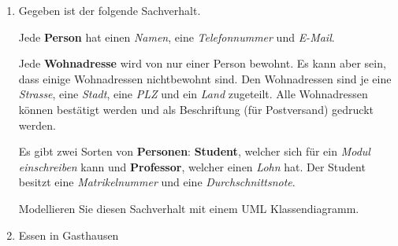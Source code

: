 \documentclass{lehramt-informatik-haupt}
\begin{document}
\begin{enumerate}
\item Gegeben ist der folgende Sachverhalt.
\cite[Seite 4]{net:pdf:uzh-zuerich:uebung-4}

Jede \textbf{Person} hat einen \emph{Namen}, eine \emph{Telefonnummer}
und \emph{E-Mail}.

Jede \textbf{Wohnadresse} wird von nur einer Person bewohnt. Es kann
aber sein, dass einige Wohnadressen nichtbewohnt sind. Den Wohnadressen
sind je eine \emph{Strasse}, eine \emph{Stadt}, eine \emph{PLZ} und ein
\emph{Land} zugeteilt. Alle Wohnadressen können bestätigt werden und als
Beschriftung (für Postversand) gedruckt werden.

Es gibt zwei Sorten von \textbf{Personen}: \textbf{Student}, welcher
sich für ein \emph{Modul einschreiben} kann und \textbf{Professor},
welcher einen \emph{Lohn} hat. Der Student besitzt eine
\emph{Matrikelnummer} und eine \emph{Durchschnittsnote}.

Modellieren Sie diesen Sachverhalt mit einem UML Klassendiagramm.


%


\item Essen in Gasthausen
\cite[Seite 4-5]{net:pdf:wikiversity:klassendiagramm}


\end{enumerate}
\end{document}
